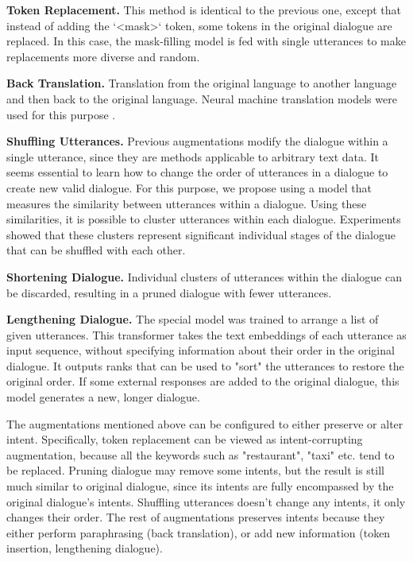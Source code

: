 \documentclass{article}
\begin{document}
\textbf{Token Replacement.} This method is identical to the previous one, except that instead of adding the `<mask>` token, some tokens in the original dialogue are replaced. In this case, the mask-filling model is fed with single utterances to make replacements more diverse and random.

\textbf{Back Translation.} Translation from the original language to another language and then back to the original language. Neural machine translation models were used for this purpose \cite{TiedemannThottingal}.

\textbf{Shuffling Utterances.} Previous augmentations modify the dialogue within a single utterance, since they are methods applicable to arbitrary text data. It seems essential to learn how to change the order of utterances in a dialogue to create new valid dialogue. For this purpose, we propose using a model that measures the similarity between utterances within a dialogue. Using these similarities, it is possible to cluster utterances within each dialogue. Experiments showed that these clusters represent significant individual stages of the dialogue that can be shuffled with each other.

\textbf{Shortening Dialogue.} Individual clusters of utterances within the dialogue can be discarded, resulting in a pruned dialogue with fewer utterances.

\textbf{Lengthening Dialogue.} The special model was trained to arrange a list of given utterances. This transformer takes the text embeddings of each utterance as input sequence, without specifying information about their order in the original dialogue. It outputs ranks that can be used to "sort" the utterances to restore the original order. If some external responses are added to the original dialogue, this model generates a new, longer dialogue.

The augmentations mentioned above can be configured to either preserve or alter intent. Specifically, token replacement can be viewed as intent-corrupting augmentation, because all the keywords such as "restaurant", "taxi" etc. tend to be replaced. Pruning dialogue may remove some intents, but the result is still much similar to original dialogue, since its intents are fully encompassed by the original dialogue's intents. 
Shuffling utterances doesn't change any intents, it only changes their order. The rest of augmentations preserves intents because they either perform paraphrasing (back translation), or add new information (token insertion, lengthening dialogue).
\end{document}
